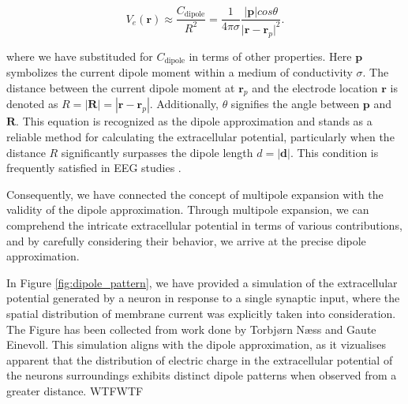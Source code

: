 \documentclass[a4paper, UKenglish, 11pt]{uiomaster}
\begin{document}
\begin{equation}
V_e(\textbf{r}) \approx \frac{C_{\text{dipole}}}{R^2} = \frac{1}{4\pi\sigma}\frac{|\textbf{p}| cos \theta}{\lvert\textbf{r}-\textbf{r}_p\rvert^2}.
\label{eq:extracellular_potential_approximation}
\end{equation}

where we have substituded for $C_\text{dipole}$ in terms of other properties. Here $\textbf{p}$ symbolizes the current dipole moment within a medium of conductivity $\sigma$. The distance between the current dipole moment at $\textbf{r}_p$ and the electrode location $\textbf{r}$ is denoted as $R = |\textbf{R}| = |\textbf{r} - \textbf{r}_p|$. Additionally, $\theta$ signifies the angle between $\textbf{p}$ and $\textbf{R}$. This equation is recognized as the dipole approximation and stands as a reliable method for calculating the extracellular potential, particularly when the distance $R$ significantly surpasses the dipole length $d=|\textbf{d}|$. This condition is frequently satisfied in EEG studies \cite{naess2021biophysically}.

Consequently, we have connected the concept of multipole expansion with the validity of the dipole approximation. Through multipole expansion, we can comprehend the intricate extracellular potential in terms of various contributions, and by carefully considering their behavior, we arrive at the precise dipole approximation.

In Figure \ref{fig:dipole_pattern}, we have provided a simulation of the extracellular potential generated by a neuron in response to a single synaptic input, where the spatial distribution of membrane current was explicitly taken into consideration. The Figure has been collected from work done by Torbjørn Næss and Gaute Einevoll. This simulation aligns with the dipole approximation, as it vizualises apparent that the distribution of electric charge in the extracellular potential of the neurons surroundings exhibits distinct dipole patterns when observed from a greater distance. WTFWTF
\end{document}
